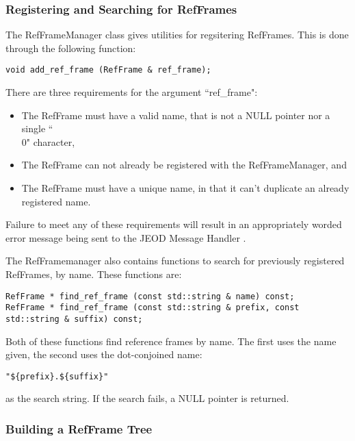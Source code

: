 \subsubsection{Registering and Searching for RefFrames}

The RefFrameManager class gives utilities for regsitering
RefFrames. This is done through the following function:

\begin{verbatim}
void add_ref_frame (RefFrame & ref_frame);
\end{verbatim}

There are three requirements for the argument ``ref\_frame":

\begin{itemize}
\item{The RefFrame must have a valid name, that is not a NULL pointer
nor a single ``\\0" character,}
\item{The RefFrame can not already be registered with the RefFrameManager, and}
\item{The RefFrame must have a unique name, in that it can't duplicate
an already registered name.}
\end{itemize}

Failure to meet any of these requirements will result in an appropriately
worded error message being sent to the JEOD Message Handler
\cite{dynenv:MESSAGE}.

The RefFramemanager also contains functions to search
for previously registered RefFrames, by name. These functions
are:

\begin{verbatim}
RefFrame * find_ref_frame (const std::string & name) const;
RefFrame * find_ref_frame (const std::string & prefix, const std::string & suffix) const;
\end{verbatim}

Both of these functions find reference frames by name. The first
uses the name given, the second uses the dot-conjoined name:

\begin{verbatim}
"${prefix}.${suffix}"
\end{verbatim}

as the search string. If the search fails, a NULL pointer
is returned.

\subsubsection{Building a RefFrame Tree}

